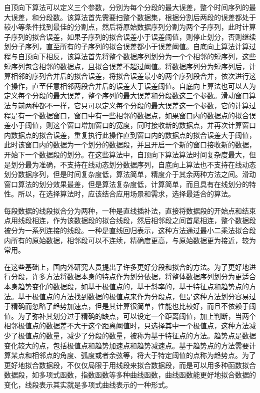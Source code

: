 自顶向下算法可以定义三个参数，分别为每个分段的最大误差，整个时间序列的最大误差，和分段数。该算法首先需要扫整个数据集，根据分割后两段的误差都处于较小等条件找到最佳的分割点，然后将原始数据序列分割为两个子序列，此时计算子序列的拟合误差，如果子序列的拟合误差小于误差阈值，则停止划分，否则继续划分子序列，直至所有的子序列的拟合误差都小于误差阈值。自底向上算法计算过程与自顶向下相反，该算法首先将整个数据序列划分为一个个相邻的短序列，这些短序列包含相邻的数据点，且拟合误差不超过阈值。将数据序列分为短序列后，计算相邻的序列合并后的拟合误差，将拟合误差最小的两个序列段合并，依次进行这个操作，直至任意相邻两段合并后的误差大于误差阈值。自底向上算法也可以人为定义每个分段的最大误差，整个序列的最大误差和分段数这三个参数。滑动窗口算法与前两种都不一样，它只可以定义每个分段的最大误差这一个参数，它的计算过程是有一个数据窗口，窗口中有一些相邻的数据点，如果窗口内的数据点的拟合误差小于阈值，则这个窗口增加窗口的宽度，同时接收新的数据点，并再次计算窗口内数据点的拟合误差，重复执行此操作直到窗口内的数据点的拟合误差大于阈值，此时该窗口内的数据为一个划分的数据段，并且开启一个新的窗口接收新的数据，开始下一个数据段的划分。在这些算法中，自顶向下算法算法时间复杂度最大，但是划分最为准确，不支持在线动态划分数据序列，自底向上算法也不支持在线动态划分数据序列，但是时间复杂度低，算法简单，精度介于其余两种方法之间。滑动窗口算法的划分效果最差，但是算法复杂度低，计算简单，而且具有在线划分的特性。所以，在选择算法时，应该结合应用场景和需求，选择最适合的算法。

每段数据的线段拟合分为两种，一种是直线插补法，直接将数据段的开始点和结束点用线段相连，作为该数据段的拟合线段，然后相邻段之间首尾相连，整个数据段被分为一系列连接的线段。一种是直线回归表示，这种方法通过最小二乘法拟合段内所有的原始数据，相邻段可以不连续，精确度更高，与原始数据更为接近，较为常用。

在这些基础上，国内外研究人员提出了许多更好分段和拟合的方法。为了更好地进行分段，许多方法将数据本身的特点作为划分依据，将整体数据序列划分为更适合本身趋势变化的数据段，如基于极值点的，基于斜率的，基于特征点和趋势点的方法。基于极值点的方法找到数据的极值点来作为分段点，但是这种方法划分容易过于精确而忽略了趋势加速点，但是其计算很简单，性能也比较好，而且不依赖于阈值。为了弥补其划分过于精确的缺点，可以设定一个距离阈值，加上判断，当两个相邻极值点的数据差不大于这个距离阈值时，只选择其中一个极值点，这种方法减少了极值点的数量，减少了分段的数量，被称为基于特征点的方法。趋势点是数据变化较大的点，包括极值点和趋势加速点和趋势减速点。基于趋势点的方法需要计算某点和相邻点的角度、弧度或者余弦等，将大于特定阈值的点称为趋势点。为了更好地拟合数据段，不仅仅局限于用线段来拟合数据段，而是可以用多种函数拟合数据段，如多项式函数，指数函数等多种曲线函数，曲线函数能更好地拟合数据的变化，线段表示其实就是多项式曲线表示的一种形式。

